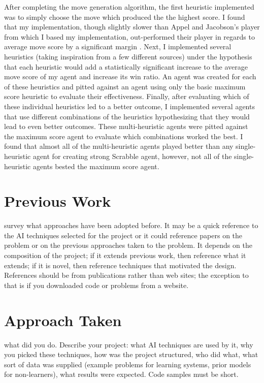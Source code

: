 \documentclass[letterpaper]{article}
\begin{document}
After completing the move generation algorithm, the first heuristic implemented was to simply choose the move which produced the the highest score. I found that my implementation, though slightly slower than Appel and Jacobson's player from which I based my implementation, out-performed their player in regards to average move score by a significant margin \cite{Appel1988}. Next, I implemented several heuristics (taking inspiration from a few different sources) under the hypothesis that each heuristic would add a statistically significant increase to the average move score of my agent and increase its win ratio. An agent was created for each of these heuristics and pitted against an agent using only the basic maximum score heuristic to evaluate their effectiveness. Finally, after evaluating which of these individual heuristics led to a better outcome, I implemented several agents that use different combinations of the heuristics hypothesizing that they would lead to even better outcomes. These multi-heuristic agents were pitted against the maximum score agent to evaluate which combinations worked the best. I found that almost all of the multi-heuristic agents played better than any single-heuristic agent for creating strong Scrabble agent, however, not all of the single-heuristic agents bested the maximum score agent.

\section{Previous Work}
survey what approaches have been adopted before. It may be a quick reference to the AI techniques selected for the project or it could reference papers on the problem or on the previous approaches taken to the problem. It depends on the composition of the project; if it extends previous work, then reference what it extends; if it is novel, then reference techniques that motivated the design. References should be from publications rather than web sites; the exception to that is if you downloaded code or problems from a website.

\section{Approach Taken}
what did you do. Describe your project: what AI techniques are used by it, why you picked these techniques, how was the project structured, who did what, what sort of data was supplied (example problems for learning systems, prior models for non-learners), what results were expected. Code samples must be short.
\end{document}
